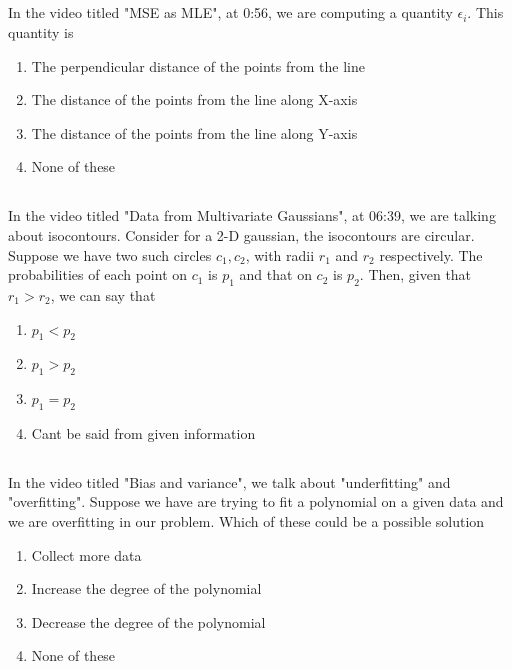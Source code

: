 \begin{frame}
\section{}
In the video titled "MSE as MLE", at 0:56, we are computing a quantity $\epsilon_i$. This quantity is
\begin{enumerate}
\item The perpendicular distance of the points from the line
\item The distance of the points from the line along X-axis
\item The distance of the points from the line along Y-axis
\item None of these   %
\end{enumerate}
\end{frame}

\begin{frame}
\section{}
In the video titled "Data from Multivariate Gaussians", at 06:39, we are talking about isocontours. Consider for a 2-D gaussian, the isocontours are circular. Suppose we have two such circles $c_1, c_2$, with radii $r_1$ and $r_2$ respectively. The probabilities of each point on $c_1$ is $p_1$ and that on $c_2$ is $p_2$. Then, given that $r_1>r_2$, we can say that
\begin{enumerate}
\item $p_1<p_2$
\item $p_1>p_2$   %
\item $p_1=p_2$
\item Cant be said from given information
\end{enumerate}
\end{frame}

\begin{frame}
\section{}
In the video titled "Bias and variance", we talk about "underfitting" and "overfitting". Suppose we have are trying to fit a polynomial on a given data and we are overfitting in our problem. Which of these could be a possible solution
\begin{enumerate}
\item Collect more data   %
\item Increase the degree of the polynomial
\item Decrease the degree of the polynomial   %
\item None of these   %
\end{enumerate}
\end{frame}

